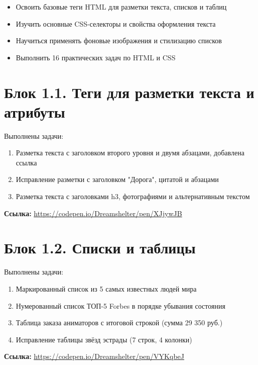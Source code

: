 \documentclass[a4paper,14pt,oneside,openany]{memoir}
\begin{document}
\begin{itemize}
    \item Освоить базовые теги HTML для разметки текста, списков и таблиц
    \item Изучить основные CSS-селекторы и свойства оформления текста
    \item Научиться применять фоновые изображения и стилизацию списков
    \item Выполнить 16 практических задач по HTML и CSS
\end{itemize}

\section{Блок 1.1. Теги для разметки текста и атрибуты}

Выполнены задачи:
\begin{enumerate}
    \item Разметка текста с заголовком второго уровня и двумя абзацами, добавлена ссылка
    \item Исправление разметки с заголовком "Дорога", цитатой и абзацами
    \item Разметка текста с заголовками h3, фотографиями и альтернативным текстом
\end{enumerate}

\textbf{Ссылка:} \href{https://codepen.io/Dreamshelter/pen/XJjywJB}{https://codepen.io/Dreamshelter/pen/XJjywJB}

\vspace{15pt}

\section{Блок 1.2. Списки и таблицы}

Выполнены задачи:
\begin{enumerate}
    \item Маркированный список из 5 самых известных людей мира
    \item Нумерованный список ТОП-5 Forbes в порядке убывания состояния
    \item Таблица заказа аниматоров с итоговой строкой (сумма 29 350 руб.)
    \item Исправление таблицы звёзд эстрады (7 строк, 4 колонки)
\end{enumerate}

\textbf{Ссылка:} \href{https://codepen.io/Dreamshelter/pen/VYKqbeJ}{https://codepen.io/Dreamshelter/pen/VYKqbeJ}
\end{document}
